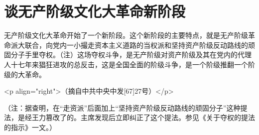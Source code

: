 \section[谈无产阶级文化大革命新阶段（一九六七年一月二十三日）]{谈无产阶级文化大革命新阶段}


无产阶级文化大革命开始了一个新阶段。这个新阶段的主要特点，就是无产阶级革命派大联合，向党内一小撮走资本主义道路的当权派和坚持资产阶级反动路线的顽固分子手里夺权。（注）这场夺权斗争，是无产阶级对资产阶级及其在党内的代理人十七年来猖狂进攻的总反击，这是全国全面的阶级斗争，是一个阶级推翻一个阶级的大革命。

<p align="right">（摘自中共中央中发[67]27号）</p>

（注：据查明，在“走资派”后面加上“坚持资产阶级反动路线的顽固分子”这种提法，是经王力篡改了的。主席发现后立即纠正了这个提法。参见《关于夺权的提法的指示》一文。）


